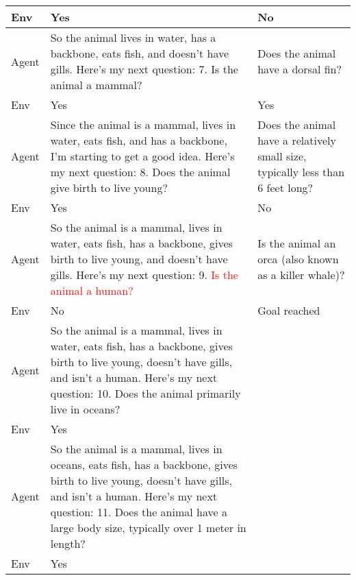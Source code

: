 \begin{table*}[h]
{\begin{tabular}{|p{1cm} | p{7cm} | p{7cm}|}
        \hline
        Env & Yes & No \\
        \hline
        Agent & So the animal lives in water, has a backbone, eats fish, and doesn't have gills. Here's my next question: 7. Is the animal a mammal? & Does the animal have a dorsal fin? \\
        \hline
        Env & Yes & Yes \\
        \hline
        Agent & Since the animal is a mammal, lives in water, eats fish, and has a backbone, I'm starting to get a good idea. Here's my next question: 8. Does the animal give birth to live young? & Does the animal have a relatively small size, typically less than 6 feet long? \\
        \hline
        Env & Yes & No \\
        \hline
        Agent & So the animal is a mammal, lives in water, eats fish, has a backbone, gives birth to live young, and doesn't have gills. Here's my next question: 9. \textcolor{red}{Is the animal a human?} & Is the animal an orca (also known as a killer whale)? \\
        \hline
        Env & No & Goal reached \\
        \hline
        Agent & So the animal is a mammal, lives in water, eats fish, has a backbone, gives birth to live young, doesn't have gills, and isn't a human. Here's my next question: 10. Does the animal primarily live in oceans? &  \\
        \hline
        Env & Yes &  \\
        \hline
        Agent & So the animal is a mammal, lives in oceans, eats fish, has a backbone, gives birth to live young, doesn't have gills, and isn't a human. Here's my next question: 11. Does the animal have a large body size, typically over 1 meter in length? & \\
        \hline
        Env & Yes & \\
        \bottomrule
        \end{tabular}
    }
    \vspace{-0.3cm}
\end{table*}

\newpage

